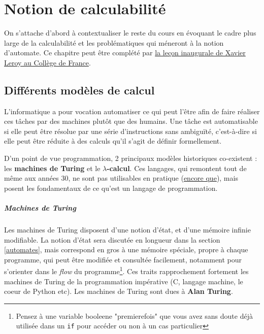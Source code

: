 
\chapter{Notion de calculabilité}

On s'attache d'abord à contextualiser le reste du cours en évoquant le cadre plus large de la calculabilité et les problématiques qui méneront à la notion d'automate. Ce chapitre peut être complété par \href{https://www.college-de-france.fr/site/xavier-leroy/inaugural-lecture-2018-11-15-18h00.htm}{la leçon inaugurale de Xavier Leroy au Collège de France}.

\section{Différents modèles de calcul}

L'informatique a pour vocation automatiser ce qui peut l'être afin de faire réaliser ces tâches par des machines plutôt que des humains. Une tâche est automatisable si elle peut être résolue par une série d'instructions sans ambiguïté, c'est-à-dire si elle peut être réduite à des calculs qu'il s'agit de définir formellement. 

D'un point de vue programmation, 2 principaux modèles historiques co-existent : les \textbf{machines de Turing} et le \textbf{$\lambda$-calcul}. Ces langages, qui remontent tout de même aux années 30, ne sont pas utilisables en pratique (\href{http://www.ens-lyon.fr/actualite/lecole/la-machine-de-turing-en-legos}{encore que}), mais posent les fondamentaux de ce qu'est un langage de programmation.

\paragraph{Machines de Turing} Les machines de Turing disposent d'une notion d'état, et d'une mémoire infinie modifiable. La notion d'état sera discutée en longueur dans la section \ref{automates}, mais correspond en gros à une mémoire spéciale, propre à chaque programme, qui peut être modifiée et consultée facilement, notamment pour s'orienter dans le \textit{flow} du programme\footnote{Pensez à une variable booleene "premierefois" que vous avez sans doute déjà utilisée dans un \texttt{if} pour accéder ou non à un cas particulier}. Ces traits rapprochement fortement les machines de Turing de la programmation impérative (C, langage machine, le coeur de Python etc). Les machines de Turing sont dues à \textbf{Alan Turing}.

